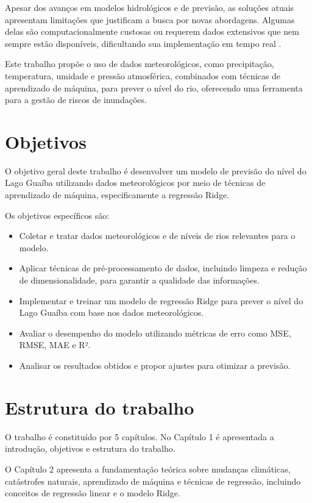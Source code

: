 Apesar dos avanços em modelos hidrológicos e de previsão, as soluções atuais apresentam limitações que justificam a busca por novas abordagens. Algumas delas são computacionalmente custosas ou requerem dados extensivos que nem sempre estão disponíveis, dificultando sua implementação em tempo real \cite{andrade2017}.

Este trabalho propõe o uso de dados meteorológicos, como precipitação, temperatura, umidade e pressão atmosférica, combinados com técnicas de aprendizado de máquina, para prever o nível do rio, oferecendo uma ferramenta para a gestão de riscos de inundações.

\section{Objetivos}

O objetivo geral deste trabalho é desenvolver um modelo de previsão do nível do Lago Guaíba utilizando dados meteorológicos por meio de técnicas de aprendizado de máquina, especificamente a regressão Ridge.

Os objetivos específicos são:

\begin{itemize}
    \item Coletar e tratar dados meteorológicos e de níveis de rios relevantes para o modelo.
    \item Aplicar técnicas de pré-processamento de dados, incluindo limpeza e redução de dimensionalidade, para garantir a qualidade das informações.
    \item Implementar e treinar um modelo de regressão Ridge para prever o nível do Lago Guaíba com base nos dados meteorológicos.
    \item Avaliar o desempenho do modelo utilizando métricas de erro como MSE, RMSE, MAE e R².
    \item Analisar os resultados obtidos e propor ajustes para otimizar a previsão.
\end{itemize}

\section{Estrutura do trabalho}

O trabalho é constituído por 5 capítulos. No Capítulo 1 é apresentada a introdução, objetivos e estrutura do trabalho.

O Capítulo 2 apresenta a fundamentação teórica sobre mudanças climáticas, catástrofes naturais, aprendizado de máquina e técnicas de regressão, incluindo conceitos de regressão linear e o modelo Ridge.

